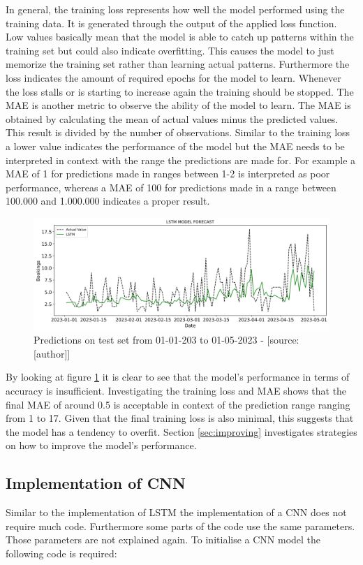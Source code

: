 In general, the training loss represents how well the model performed using the training data. It is generated through the output of the applied loss function. Low values basically mean that the model is able to catch up patterns within the training set but could also indicate overfitting. This causes the model to just memorize the training set rather than learning actual patterns. Furthermore the loss indicates the amount of required epochs for the model to learn. Whenever the loss stalls or is starting to increase again the training should be stopped. The MAE is another metric to observe the ability of the model to learn. The MAE is obtained by calculating the mean of actual values minus the predicted values. This result is divided by the number of observations.\cite{mae} Similar to the training loss a lower value indicates the performance of the model but the MAE needs to be interpreted in context with the range the predictions are made for. For example a MAE of 1 for predictions made in ranges between 1-2 is interpreted as poor performance, whereas a MAE of 100 for predictions made in a range between 100.000 and 1.000.000 indicates a proper result.

\begin{figure}[H]
	\centering
		\includegraphics[width=14cm]{images/paper_1_lstm_1_prediction}
	\caption{Predictions on test set from 01-01-203 to 01-05-2023 - [source:[author]]}
	\label{fig:lstm_1_training_test}
\end{figure}
By looking at figure \ref{fig:lstm_1_training_test} it is clear to see that the model's performance in terms of accuracy is insufficient. Investigating the training loss and MAE shows that the final MAE of around 0.5 is acceptable in context of the prediction range ranging from 1 to 17. Given that the final training loss is also minimal, this suggests that the model has a tendency to overfit. Section \ref{sec:improving} investigates strategies on how to improve the model's performance.

\subsection{Implementation of CNN}
Similar to the implementation of LSTM the implementation of a CNN does not require much code. Furthermore some parts of the code use the same parameters. Those parameters are not explained again. To initialise a CNN model the following code is required: 

